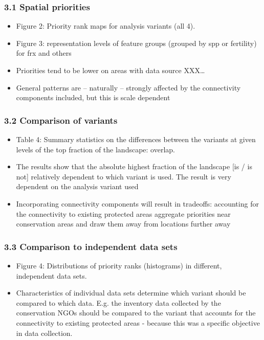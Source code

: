 \documentclass[]{article}
\begin{document}
\subsubsection{3.1 Spatial priorities}

\begin{itemize}
\itemsep1pt\parskip0pt
\item
  Figure 2: Priority rank maps for analysis variants (all 4).
\item
  Figure 3: representation levels of feature groups (grouped by spp or
  fertility) for frx and others
\item
  Priorities tend to be lower on areas with data source XXX\ldots{}
\item
  General patterns are -- naturally -- strongly affected by the
  connectivity components included, but this is scale dependent
\end{itemize}

\subsubsection{3.2 Comparison of variants}

\begin{itemize}
\itemsep1pt\parskip0pt
\item
  Table 4: Summary statistics on the differences between the variants at
  given levels of the top fraction of the landscape: overlap.
\item
  The results show that the absolute highest fraction of the landscape
  {[}is / is not{]} relatively dependent to which variant is used. The
  result is very dependent on the analysis variant used
\item
  Incorporating connectivity components will result in tradeoffs:
  accounting for the connectivity to existing protected areas aggregate
  priorities near conservation areas and draw them away from locations
  further away
\end{itemize}

\subsubsection{3.3 Comparison to independent data sets}

\begin{itemize}
\itemsep1pt\parskip0pt
\item
  Figure 4: Distributions of priority ranks (histograms) in different,
  independent data sets.
\item
  Characteristics of individual data sets determine which variant should
  be compared to which data. E.g. the inventory data collected by the
  conservation NGOs should be compared to the variant that accounts for
  the connectivity to existing protected areas - because this was a
  specific objective in data collection.
\end{itemize}
\end{document}
